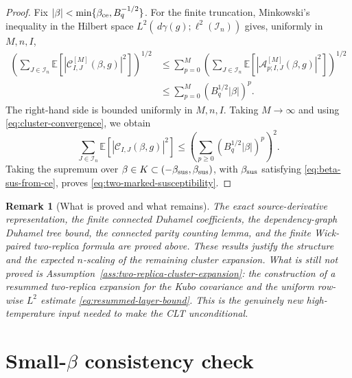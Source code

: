 \documentclass[11pt]{article}
\newtheorem{remark}[theorem]{Remark}
\newcommand{\E}{\mathbb{E}}
\newcommand{\calI}{\mathcal{I}}
\newcommand{\dd}{\,d}
\begin{document}
\begin{proof}
  Fix $|\beta|<\min\{\beta_{\rm ce},B_q^{-1/2}\}$.  For the finite truncation,
  Minkowski's inequality
  in the Hilbert space
  $L^2(\dd\gamma(g);\ell^2(\calI_n))$ gives, uniformly in $M,n,I$,
  \begin{align}\label{eq:cluster-to-susceptibility-proof}
    \left(
      \sum_{J\in\calI_n}
      \E\left[
        \left|
          \mathcal C^{[M]}_{I,J}(\beta,g)
        \right|^2
      \right]
    \right)^{1/2}
    &\leq
    \sum_{p=0}^M
    \left(
      \sum_{J\in\calI_n}
      \E\left[
        \left|
          \mathcal A^{[M]}_{p;I,J}(\beta,g)
        \right|^2
      \right]
    \right)^{1/2} \\
    &\leq
    \sum_{p=0}^M
    (B_q^{1/2}|\beta|)^p.
  \end{align}
  The right-hand side is bounded uniformly in $M,n,I$.  Taking $M\to\infty$
  and using \eqref{eq:cluster-convergence}, we obtain
  \begin{equation}\label{eq:susceptibility-from-cluster-limit}
    \sum_{J\in\calI_n}
    \E\left[
      \left|
        \mathcal C_{I,J}(\beta,g)
      \right|^2
    \right]
    \leq
    \left(
      \sum_{p\geq0}(B_q^{1/2}|\beta|)^p
    \right)^2.
  \end{equation}
  Taking the supremum over $\beta\in K\subset(-\beta_{\rm sus},\beta_{\rm sus})$, with $\beta_{\rm sus}$ satisfying \eqref{eq:beta-sus-from-ce}, proves
  \eqref{eq:two-marked-susceptibility}.
\end{proof}

\begin{remark}[What is proved and what remains]
  The exact source-derivative representation, the finite connected Duhamel
  coefficients, the dependency-graph Duhamel tree bound, the connected parity
  counting lemma, and the finite Wick-paired two-replica formula are proved
  above.  These results justify the structure and the expected $n$-scaling of
  the remaining cluster expansion.  What is still not proved is
  Assumption~\ref{ass:two-replica-cluster-expansion}: the construction of a
  resummed two-replica expansion for the Kubo covariance and the uniform row-wise
  $L^2$ estimate \eqref{eq:resummed-layer-bound}.  This is the genuinely new
  high-temperature input needed to make the CLT unconditional.
\end{remark}

\section{\texorpdfstring{Small-$\beta$ consistency check}{Small-beta consistency check}}
\end{document}
